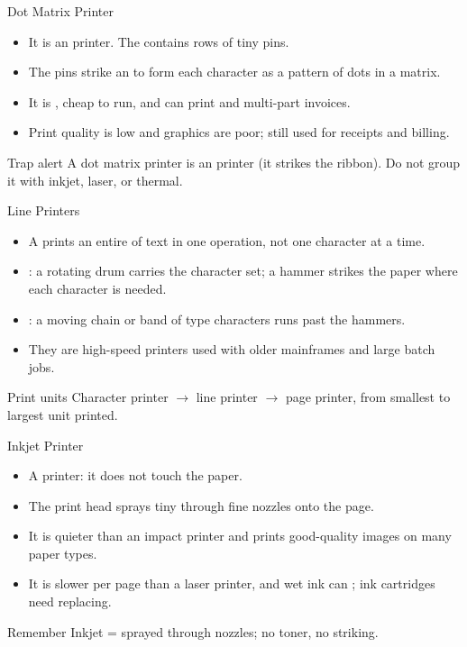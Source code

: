 \documentclass[aspectratio=169]{beamer}
\begin{document}
\begin{frame}{Dot Matrix Printer}
  \begin{itemize}
    \item It is an  printer. The  contains rows
      of tiny pins.
    \item The pins strike an  to form each character as a
      pattern of dots in a matrix.
    \item It is , cheap to run, and can print 
      and multi-part invoices.
    \item Print quality is low and graphics are poor; still used for receipts
      and billing.
  \end{itemize}
  \begin{alertblock}{Trap alert}
    A dot matrix printer is an  printer (it strikes the ribbon).
    Do not group it with inkjet, laser, or thermal.
  \end{alertblock}
\end{frame}

\begin{frame}{Line Printers}
  \begin{itemize}
    \item A  prints an entire  of text in one
      operation, not one character at a time.
    \item {}: a rotating drum carries the character set; a
      hammer strikes the paper where each character is needed.
    \item {}: a moving chain or band of type
      characters runs past the hammers.
    \item They are high-speed  printers used with older
      mainframes and large batch jobs.
  \end{itemize}
  \begin{block}{Print units}
    Character printer $\rightarrow$ line printer $\rightarrow$ page printer,
    from smallest to largest unit printed.
  \end{block}
\end{frame}

\begin{frame}{Inkjet Printer}
  \begin{itemize}
    \item A  printer: it does not touch the paper.
    \item The print head sprays tiny  through
      fine nozzles onto the page.
    \item It is quieter than an impact printer and prints good-quality
       images on many paper types.
    \item It is slower per page than a laser printer, and wet ink can
      ; ink cartridges need replacing.
  \end{itemize}
  \begin{block}{Remember}
    Inkjet =  sprayed through nozzles; no toner, no striking.
  \end{block}
\end{frame}
\end{document}
